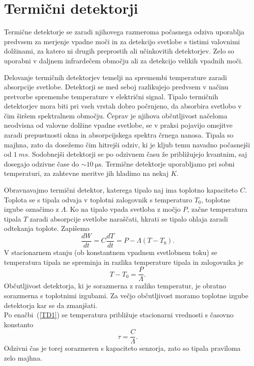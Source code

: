 \section{Termični detektorji}
Termične detektorje se zaradi njihovega razmeroma počasnega odziva uporablja predvsem 
za merjenje vpadne moči in za detekcijo svetlobe s tistimi valovnimi dolžinami, za katero 
ni drugih preprostih ali učinkovitih detektorjev. Zelo so uporabni v daljnem
infrardečem območju ali za detekcijo velikih vpadnih moči.

Delovanje termičnih detektorjev temelji na spremembi temperature zaradi absorpcije svetlobe. 
Detektorji se med seboj razlikujejo predvsem v načinu pretvorbe spremembe 
temperature v električni signal.
Tipalo termičnih detektorjev mora biti pri vseh vrstah dobro počrnjeno, da absorbira
svetlobo v čim širšem spektralnem območju. Čeprav je njihova občutljivost načeloma 
neodvisna od valovne dolžine vpadne svetlobe, se v praksi pojavijo omejitve zaradi
prepustnosti okna in absorpcijskega spektra črnega nanosa. Tipala so majhna, zato 
da dosežemo čim hitrejši odziv, ki je kljub temu navadno počasnejši od $1~\si{ms}$. 
Sodobnejši detektorji se po odzivnem času že približujejo 
kvantnim, saj dosegajo odzivne čase do $\sim 10~\si{\micro\second}$. 
Termične detektorje uporabljamo pri sobni temperaturi,  
za zahtevne meritve jih hladimo na nekaj $\si{K}$. 

Obravnavajmo termični detektor, katerega tipalo naj ima toplotno kapaciteto $C$. Toplota
se s tipala odvaja v toplotni zalogovnik s temperaturo $T_0$, 
toplotne izgube označimo z $\Lambda$. Ko na tipalo vpada svetloba z močjo $P$, 
začne temperatura tipala $T$ zaradi absorpcije svetlobe naraščati, hkrati se tipalo 
ohlaja zaradi odtekanja toplote. Zapišemo
\begin{equation}
\frac{dW}{dt} = C \frac{dT}{dt} = P - \Lambda (T-T_0).
\label{TD1}
\end{equation}
V stacionarnem stanju (ob konstantnem vpadnem svetlobnem toku) se
temperatura tipala ne spreminja in razlika temperature tipala in zalogovnika je 
\begin{equation}
T - T_0 = \frac{P}{\Lambda}.
\label{temp_sens}
\end{equation}
Občutljivost detektorja, ki je sorazmerna z razliko temperatur, 
je obratno sorazmerna s toplotnimi izgubami. Za večjo občutljivost moramo
toplotne izgube detektorja kar se da zmanjšati. \\
Po enačbi~(\ref{TD1}) se temperatura približuje stacionarni vrednosti s časovno konstanto 
\begin{equation}
\tau = \frac{C}{\Lambda}.
\label{TermD_t}
\end{equation}
Odzivni čas je torej sorazmeren s kapaciteto senzorja, zato so tipala praviloma 
zelo majhna.

